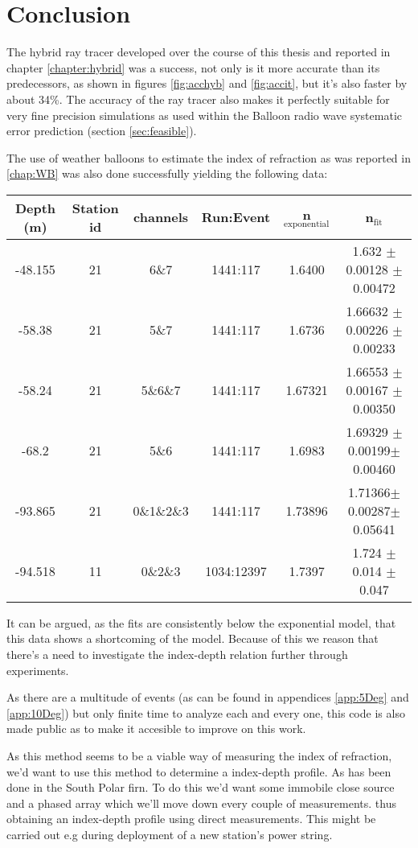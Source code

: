 \chapter*{Conclusion}
The hybrid ray tracer developed over the course of this thesis and reported in
chapter \ref{chapter:hybrid} was a success, not only is it more accurate than
its predecessors, as shown in figures \ref{fig:acchyb} and \ref{fig:accit},
 but it's also faster by about 34\%.  The accuracy of the ray tracer also
makes it perfectly suitable for very fine precision simulations as used within
the Balloon radio wave systematic error prediction (section \ref{sec:feasible}).

The use of weather balloons to estimate the index of refraction as
was reported in \ref{chap:WB} was also done successfully 
yielding the following data:
\begin{center}
\begin{tabular}{||c c c c c c||}
 \hline
 Depth (m) & Station id & channels & Run:Event & n$_\text{exponential}$ & n$_\text{fit}$\\ [0.5ex]
 \hline\hline
 -48.155 & 21 & 6\&7 & 1441:117 & 1.6400 & 1.632 $\pm$ 0.00128 $\pm$ 0.00472\\
 -58.38 & 21 & 5\&7 & 1441:117 & 1.6736 & 1.66632 $\pm$ 0.00226 $\pm$ 0.00233 \\
 -58.24 & 21 & 5\&6\&7 & 1441:117 & 1.67321 & 1.66553 $\pm$ 0.00167 $\pm$ 0.00350 \\
 -68.2 & 21 & 5\&6 & 1441:117 & 1.6983 & 1.69329 $\pm$0.00199$\pm$0.00460 \\
 -93.865 & 21 & 0\&1\&2\&3 & 1441:117 & 1.73896 & 1.71366$\pm$0.00287$\pm$0.05641\\
 -94.518 & 11 & 0\&2\&3 & 1034:12397 & 1.7397 & 1.724 $\pm$ 0.014 $\pm$ 0.047 \\
 \hline
\end{tabular}
\end{center}
It can be argued, as the fits are consistently below the exponential model,
that this data shows a shortcoming of the model.  Because of this we reason
that there's a need to investigate the index-depth relation further through 
experiments.

As there are a multitude of events (as can be found in appendices
\ref{app:5Deg} and \ref{app:10Deg}) but only finite time to analyze each and
every one, this code is also made public \cite{projects-mt} as to make
it accesible to improve on this work.  

As this method seems to be a viable way of measuring the index of refraction,
we'd want to use this method to determine a index-depth profile.
As has been done in the South Polar firn\cite{kravchenko_besson_meyers_2004}.
To do this we'd want some immobile close source and a phased array which we'll
move down every couple of measurements. thus obtaining an index-depth profile
using direct measurements. This might be carried out e.g during deployment
of a new station's power string.
